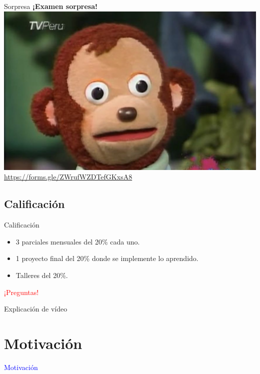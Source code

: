 \documentclass[10pt,xcolor={dvipsnames}]{beamer}
\begin{document}
\begin{frame}{Sorpresa}
 {\Large{\textbf{¡Examen sorpresa!}}}
 {\includegraphics[scale=0.25]{Figures/mono}}
 {\Large{\url{https://forms.gle/ZWrufWZDTefGKxsA8}}}
\end{frame}

\subsection{Calificación}
\begin{frame}{Calificación}
\begin{itemize}
\item<1-|alert@1> 3 parciales mensuales del 20\% cada uno.
\item<2-|alert@2> 1 proyecto final del 20\% donde se implemente lo aprendido.
\item<3-|alert@3> Talleres del 20\%.
\end{itemize}
 {\Huge{\textcolor{red}{¡Preguntas!}}}
\end{frame}

\begin{frame}
\Huge{Explicación de vídeo}
\end{frame}

\section{Motivación}
\begin{frame}
\begin{center}
\Huge{\textcolor{blue}{Motivación}}
\end{center}
\end{frame}
\end{document}
